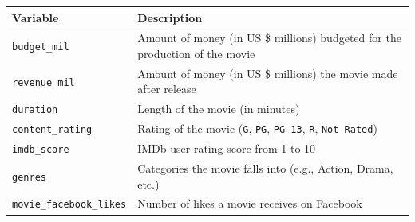 \documentclass[
]{report}
\begin{document}
\begin{longtable}[]{@{}ll@{}}
\toprule
\begin{minipage}[b]{0.22\columnwidth}\raggedright
\textbf{Variable}\strut
\end{minipage} & \begin{minipage}[b]{0.72\columnwidth}\raggedright
\textbf{Description} \textbar{}\strut
\end{minipage}\tabularnewline
\midrule
\endhead
\begin{minipage}[t]{0.22\columnwidth}\raggedright
\texttt{budget\_mil}\strut
\end{minipage} & \begin{minipage}[t]{0.72\columnwidth}\raggedright
Amount of money (in US \$ millions) budgeted for the production of the movie\strut
\end{minipage}\tabularnewline
\begin{minipage}[t]{0.22\columnwidth}\raggedright
\texttt{revenue\_mil}\strut
\end{minipage} & \begin{minipage}[t]{0.72\columnwidth}\raggedright
Amount of money (in US \$ millions) the movie made after release\strut
\end{minipage}\tabularnewline
\begin{minipage}[t]{0.22\columnwidth}\raggedright
\texttt{duration}\strut
\end{minipage} & \begin{minipage}[t]{0.72\columnwidth}\raggedright
Length of the movie (in minutes)\strut
\end{minipage}\tabularnewline
\begin{minipage}[t]{0.22\columnwidth}\raggedright
\texttt{content\_rating}\strut
\end{minipage} & \begin{minipage}[t]{0.72\columnwidth}\raggedright
Rating of the movie (\texttt{G}, \texttt{PG}, \texttt{PG-13}, \texttt{R}, \texttt{Not\ Rated})\strut
\end{minipage}\tabularnewline
\begin{minipage}[t]{0.22\columnwidth}\raggedright
\texttt{imdb\_score}\strut
\end{minipage} & \begin{minipage}[t]{0.72\columnwidth}\raggedright
IMDb user rating score from 1 to 10\strut
\end{minipage}\tabularnewline
\begin{minipage}[t]{0.22\columnwidth}\raggedright
\texttt{genres}\strut
\end{minipage} & \begin{minipage}[t]{0.72\columnwidth}\raggedright
Categories the movie falls into (e.g., Action, Drama, etc.)\strut
\end{minipage}\tabularnewline
\begin{minipage}[t]{0.22\columnwidth}\raggedright
\texttt{movie\_facebook\_likes}\strut
\end{minipage} & \begin{minipage}[t]{0.72\columnwidth}\raggedright
Number of likes a movie receives on Facebook\strut
\end{minipage}\tabularnewline
\bottomrule
\end{longtable}
\end{document}

